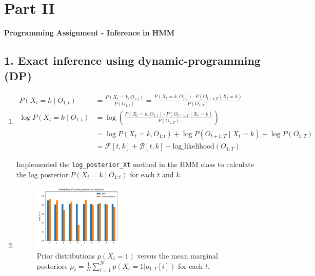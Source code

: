 \documentclass[a4 paper]{article}
\begin{document}
\newpage
\section*{Part II}
\textbf{Programming Assignment - Inference in HMM}


\subsection*{1. Exact inference using dynamic-programming (DP)}

\begin{enumerate}
    \item {}
    
    \begin{align*}
        P(X_t = k \mid O_{1:t}) &= \frac{P(X_t = k, O_{1:t})}{P(O_{1:t})} = \frac{P(X_t = k, O_{1:t}) \cdot P(O_{t+1:T} \mid X_t = k)}{P(O_{1:T})} \\
        \log P(X_t = k \mid O_{1:t}) &= \log \left( \frac{P(X_t = k, O_{1:t}) \cdot P(O_{t+1:T} \mid X_t = k)}{P(O_{1:T})} \right) \\
        &= \log P(X_t = k, O_{1:t}) + \log P(O_{t+1:T} \mid X_t = k) - \log P(O_{1:T}) \\
        &= \mathcal{F}[t, k] + \mathcal{B}[t, k] - \text{log\_likelihood}(O_{1:T})
    \end{align*}

    Implemented the \texttt{log\_posterior\_Xt} method in the HMM class to calculate the log posterior $P(X_t = k \mid O_{1:t})$ for each $t$ and $k$.


    
    \item {}

    \begin{figure}[H]
        \centering
        \includegraphics[width=0.4\textwidth]{../plots/q1_prior_vs_mean_posterior.png}
        \caption{Prior distributions $p(X_t = 1)$ versus the mean marginal posteriors $\mu_t = \frac{1}{N} \sum_{i=1}^{N} p(X_t = 1 | o_{1:T}[i])$ for each $t$.}
    \end{figure}


\end{enumerate}
\end{document}
